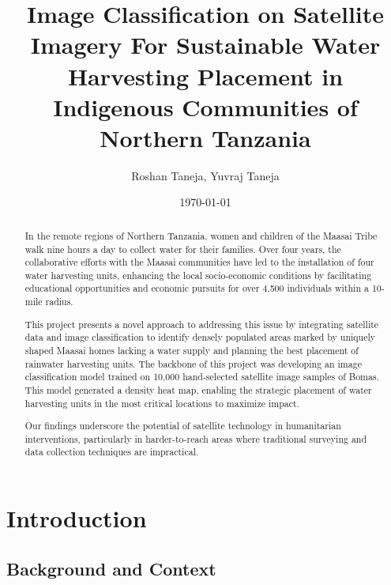 \documentclass[10pt]{article}
\title{Image Classification on Satellite Imagery For Sustainable Water Harvesting Placement in Indigenous Communities of Northern Tanzania}
\author{Roshan Taneja, Yuvraj Taneja}
\date{\today}
\begin{document}
\maketitle

\begin{abstract}

In the remote regions of Northern Tanzania, women and children of the Maasai Tribe walk nine hours a day to collect water for their families. Over four years, the collaborative efforts with the Maasai communities have led to the installation of four water harvesting units, enhancing the local socio-economic conditions by facilitating educational opportunities and economic pursuits for over 4,500 individuals within a 10-mile radius.

This project presents a novel approach to addressing this issue by integrating satellite data and image classification to identify densely populated areas marked by uniquely shaped Maasai homes lacking a water supply and planning the best placement of rainwater harvesting units. The backbone of this project was developing an image classification model trained on 10,000 hand-selected satellite image samples of Bomas. This model generated a density heat map, enabling the strategic placement of water harvesting units in the most critical locations to maximize impact.

Our findings underscore the potential of satellite technology in humanitarian interventions, particularly in harder-to-reach areas where traditional surveying and data collection techniques are impractical.
    
\end{abstract}


\section{Introduction}

\subsection{Background and Context}
\end{document}
